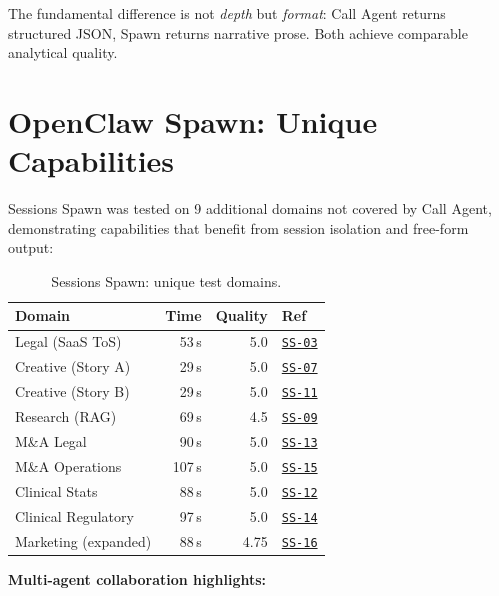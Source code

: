\documentclass[11pt,twocolumn]{article}
\newcommand{\ghbase}{https://github.com/agenticmail/agenticmail/blob/main/research/agent-rpc-vs-spawn}
\begin{document}
The fundamental difference is not \emph{depth} but \emph{format}: Call Agent returns structured JSON, Spawn returns narrative prose. Both achieve comparable analytical quality.

\section{OpenClaw Spawn: Unique Capabilities}

Sessions Spawn was tested on 9 additional domains not covered by Call Agent, demonstrating capabilities that benefit from session isolation and free-form output:

\begin{table}[H]
\centering
\caption{Sessions Spawn: unique test domains.}
\begin{tabular}{@{}lrrl@{}}
\toprule
\textbf{Domain} & \textbf{Time} & \textbf{Quality} & \textbf{Ref} \\
\midrule
Legal (SaaS ToS) & 53\,s & 5.0 & \href{\ghbase/results/03-legal-saas.md}{\texttt{SS-03}} \\
Creative (Story A) & 29\,s & 5.0 & \href{\ghbase/results/07-story-part-a.md}{\texttt{SS-07}} \\
Creative (Story B) & 29\,s & 5.0 & \href{\ghbase/results/11-story-part-b.md}{\texttt{SS-11}} \\
Research (RAG) & 69\,s & 4.5 & \href{\ghbase/results/09-research-rag.md}{\texttt{SS-09}} \\
M\&A Legal & 90\,s & 5.0 & \href{\ghbase/results/13-ma-legal.md}{\texttt{SS-13}} \\
M\&A Operations & 107\,s & 5.0 & \href{\ghbase/results/15-ma-operations.md}{\texttt{SS-15}} \\
Clinical Stats & 88\,s & 5.0 & \href{\ghbase/results/12-clinical-stats.md}{\texttt{SS-12}} \\
Clinical Regulatory & 97\,s & 5.0 & \href{\ghbase/results/14-clinical-regulatory.md}{\texttt{SS-14}} \\
Marketing (expanded) & 88\,s & 4.75 & \href{\ghbase/results/16-marketing-campaign.md}{\texttt{SS-16}} \\
\bottomrule
\end{tabular}
\end{table}

\textbf{Multi-agent collaboration highlights:}
\end{document}
